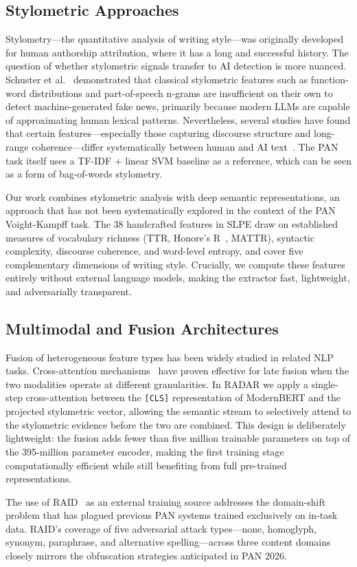 \subsection{Stylometric Approaches}

Stylometry—the quantitative analysis of writing style—was originally developed for human authorship attribution, where it has a long and successful history. The question of whether stylometric signals transfer to AI detection is more nuanced. Schuster et al.~\cite{schuster:2020} demonstrated that classical stylometric features such as function-word distributions and part-of-speech n-grams are insufficient on their own to detect machine-generated fake news, primarily because modern LLMs are capable of approximating human lexical patterns. Nevertheless, several studies have found that certain features—especially those capturing discourse structure and long-range coherence—differ systematically between human and AI text~\cite{uchendu:2020}. The PAN task itself uses a TF-IDF + linear SVM baseline as a reference, which can be seen as a form of bag-of-words stylometry.

Our work combines stylometric analysis with deep semantic representations, an approach that has not been systematically explored in the context of the PAN Voight-Kampff task. The 38 handcrafted features in SLPE draw on established measures of vocabulary richness (TTR, Honore's R~\cite{honore:1979}, MATTR), syntactic complexity, discourse coherence, and word-level entropy, and cover five complementary dimensions of writing style. Crucially, we compute these features entirely without external language models, making the extractor fast, lightweight, and adversarially transparent.

\subsection{Multimodal and Fusion Architectures}

Fusion of heterogeneous feature types has been widely studied in related NLP tasks. Cross-attention mechanisms~\cite{vaswani:2017} have proven effective for late fusion when the two modalities operate at different granularities. In RADAR we apply a single-step cross-attention between the \texttt{[CLS]} representation of ModernBERT and the projected stylometric vector, allowing the semantic stream to selectively attend to the stylometric evidence before the two are combined. This design is deliberately lightweight: the fusion adds fewer than five million trainable parameters on top of the 395-million parameter encoder, making the first training stage computationally efficient while still benefiting from full pre-trained representations.

The use of RAID~\cite{dugan:2024} as an external training source addresses the domain-shift problem that has plagued previous PAN systems trained exclusively on in-task data. RAID's coverage of five adversarial attack types—none, homoglyph, synonym, paraphrase, and alternative spelling—across three content domains closely mirrors the obfuscation strategies anticipated in PAN 2026.
